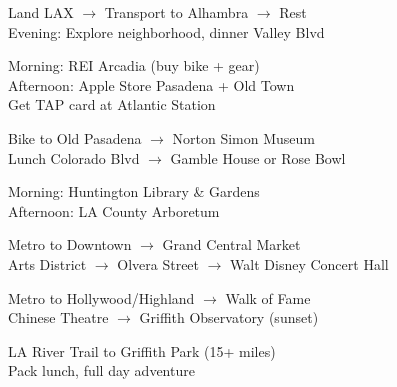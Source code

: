 \documentclass[10pt,letterpaper]{article}
\begin{document}
\begin{small}

\begin{tcolorbox}[colback=primary!5,colframe=primary!50,title=\textbf{Day 1 - Mon, Nov 10: ARRIVAL}]
Land LAX $\rightarrow$ Transport to Alhambra $\rightarrow$ Rest\\
Evening: Explore neighborhood, dinner Valley Blvd
\end{tcolorbox}

\begin{tcolorbox}[colback=primary!5,colframe=primary!50,title=\textbf{Day 2 - Tue, Nov 11: GET EQUIPPED}]
Morning: REI Arcadia (buy bike + gear)\\
Afternoon: Apple Store Pasadena + Old Town\\
Get TAP card at Atlantic Station
\end{tcolorbox}

\begin{tcolorbox}[colback=primary!5,colframe=primary!50,title=\textbf{Day 3 - Wed, Nov 12: PASADENA DAY}]
Bike to Old Pasadena $\rightarrow$ Norton Simon Museum\\
Lunch Colorado Blvd $\rightarrow$ Gamble House or Rose Bowl
\end{tcolorbox}

\begin{tcolorbox}[colback=primary!5,colframe=primary!50,title=\textbf{Day 4 - Thu, Nov 13: GARDENS}]
Morning: Huntington Library \& Gardens\\
Afternoon: LA County Arboretum
\end{tcolorbox}

\begin{tcolorbox}[colback=primary!5,colframe=primary!50,title=\textbf{Day 5 - Fri, Nov 14: DOWNTOWN LA}]
Metro to Downtown $\rightarrow$ Grand Central Market\\
Arts District $\rightarrow$ Olvera Street $\rightarrow$ Walt Disney Concert Hall
\end{tcolorbox}

\begin{tcolorbox}[colback=primary!5,colframe=primary!50,title=\textbf{Day 6 - Sat, Nov 15: HOLLYWOOD}]
Metro to Hollywood/Highland $\rightarrow$ Walk of Fame\\
Chinese Theatre $\rightarrow$ Griffith Observatory (sunset)
\end{tcolorbox}

\begin{tcolorbox}[colback=primary!5,colframe=primary!50,title=\textbf{Day 7 - Sun, Nov 16: LONG BIKE RIDE}]
LA River Trail to Griffith Park (15+ miles)\\
Pack lunch, full day adventure
\end{tcolorbox}


\end{small}
\end{document}
